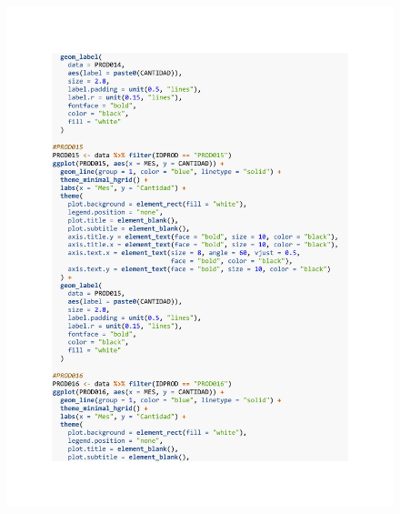 \begin{figure}[h!]
        \begin{tcolorbox}[colback=white, colframe=black, boxrule=1.5pt, sharp corners=all]
            {\includegraphics[width=\linewidth, height=22cm, trim=2.5cm 2.5cm 2.5cm 2.5cm, clip]{images/script14.pdf}}
        \end{tcolorbox}
\end{figure}

